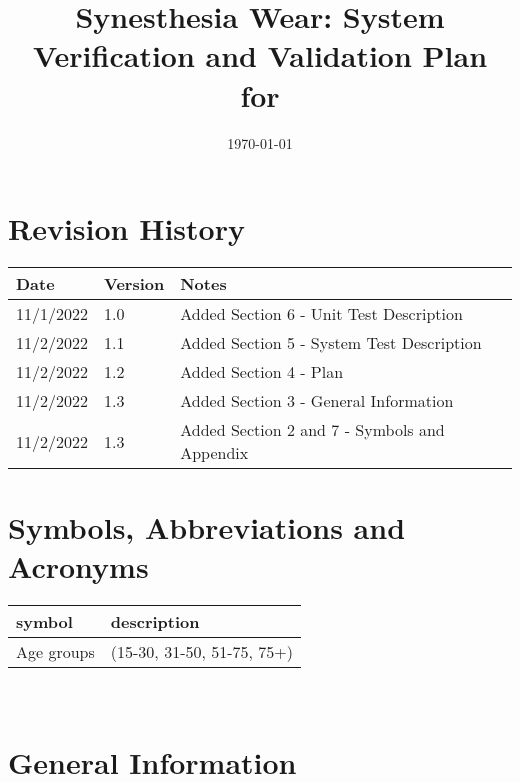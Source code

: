 \documentclass[12pt, titlepage]{article}
\begin{document}
\title{Synesthesia Wear: System Verification and Validation Plan for \progname{}} 
\author{\authname}
\date{\today}
	
\maketitle


\section{Revision History}

\begin{tabularx}{\textwidth}{p{3cm}p{2cm}X}
\toprule {\bf Date } & {\bf Version} & {\bf Notes}\\
\midrule
11/1/2022 & 1.0 & Added Section 6 - Unit Test Description\\
11/2/2022 & 1.1 & Added Section 5 - System Test Description\\
11/2/2022 & 1.2 & Added Section 4 - Plan\\
11/2/2022 & 1.3 & Added Section 3 - General Information\\
11/2/2022 & 1.3 & Added Section 2 and 7 - Symbols and Appendix\\
\bottomrule
\end{tabularx}

\newpage

\tableofcontents

\listoftables

\newpage

\section{Symbols, Abbreviations and Acronyms}

\renewcommand{\arraystretch}{1.2}
\begin{tabular}{l l} 
  \toprule		
  \textbf{symbol} & \textbf{description}\\
  \midrule 
  Age groups & (15-30, 31-50, 51-75, 75+)\\
  \bottomrule
\end{tabular}\\

\newpage


\section{General Information}
\end{document}
